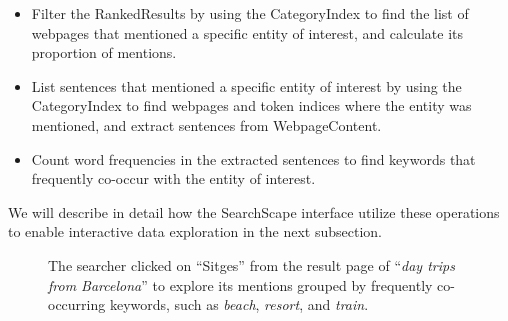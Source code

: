 \begin{itemize}

    \item Filter the RankedResults by using the CategoryIndex to find the list of webpages that mentioned a specific entity of interest, and calculate its proportion of mentions.
    \item List sentences that mentioned a specific entity of interest by using the CategoryIndex to find webpages and token indices where the entity was mentioned, and extract sentences from WebpageContent.
    \item Count word frequencies in the extracted sentences to find keywords that frequently co-occur with the entity of interest.
\end{itemize}

We will describe in detail how the SearchScape interface utilize these operations to enable interactive data exploration in the next subsection. 


\begin{figure}
    \centering

    \vspace{0.5mm}
    
    
    \caption[Explore mentions and frequently co-occurring words of an concept.]{The searcher clicked on ``Sitges'' from the result page of ``\emph{day trips from Barcelona}'' to explore its mentions grouped by frequently co-occurring keywords, such as \emph{beach}, \emph{resort}, and \emph{train}.}
    \label{fig:keywords}
\end{figure}



